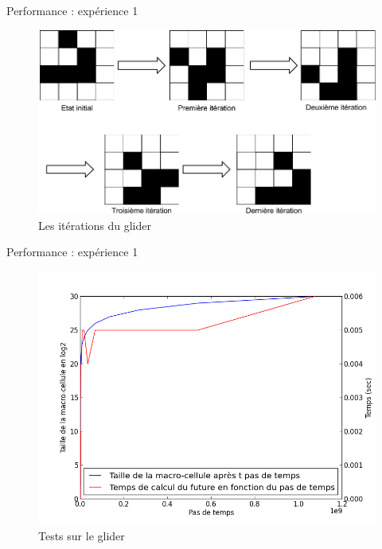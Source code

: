 \documentclass{beamer}
\begin{document}
\begin{frame}{Performance : expérience 1}
  \begin{figure}
    \centering
    \includegraphics[scale=0.3]{perf_glider_iterations.png}
    \caption{Les itérations du glider}
  \end{figure}
\end{frame}

\begin{frame}{Performance : expérience 1}
  \begin{figure}
    \centering
    \includegraphics[scale=0.4]{perf_glider_graph.png}
    \caption{Tests sur le glider}
  \end{figure}
\end{frame}
\end{document}
